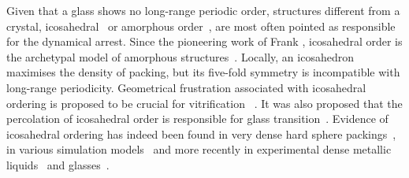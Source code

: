 Given that a glass shows no long-range periodic order, structures different from a crystal, icosahedral~\cite{steinhardt1983boo,sadoc1999geometrical, tarjus2005fba} or amorphous order~\cite{lubchenko2007}, are most often pointed as responsible for the dynamical arrest. Since the pioneering work of Frank \cite{Frank1952}, icosahedral order is the archetypal model of amorphous structures~\citep{Spaepen2000}. Locally, an icosahedron maximises the density of packing, but its five-fold symmetry is incompatible with long-range periodicity. Geometrical frustration associated with icosahedral ordering is proposed to be crucial for vitrification ~\cite{steinhardt1983boo,sadoc1999geometrical, tarjus2005fba}. It was also proposed that the percolation of icosahedral order is responsible for glass transition~\cite{Tomida1995}.  Evidence of icosahedral ordering has indeed been found in very dense hard sphere packings~\citep{Bernal1960, Clarke1993, Anikeenko2007, Malshe2011, Charbonneau}, in various simulation models~\citep{steinhardt1983boo, Tomida1995, Doye2003, Pedersen2010, Coslovich2011} and more recently in experimental dense metallic liquids~\citep{Reichert2000, Celino2007} and glasses~\citep{Luo2004, Wang2011}.

